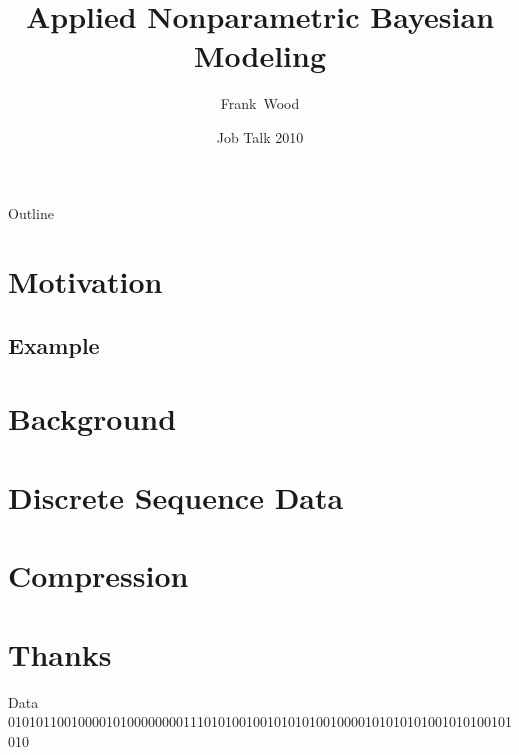 \documentclass{beamer}
\title[Applied Nonparametric Bayesian Modeling] 
{
  Applied Nonparametric Bayesian Modeling
}
\author[Wood]
{
  Frank~Wood%
}
\institute[Columbia University]
{
  Columbia University
}
\date[Job Talk 2010]
{Job Talk 2010}
\begin{document}


\begin{frame}
  \titlepage
\end{frame}

\begin{frame}{Outline}
  \tableofcontents
\end{frame}

\section{Motivation}
\subsection{Example}
\section{Background}



\section{Discrete Sequence Data}
\section{Compression}
\section{Thanks}

\begin{frame}{Data}
010101100100001010000000011101010010010101010010000101010101001010100101010
\end{frame}
	
\end{document}
